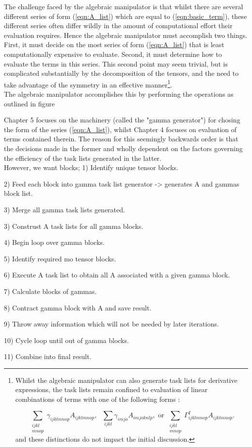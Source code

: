 \noindent The challenge faced by the algebraic manipulator is that whilst there are several different
series of form (\ref{eqn:A_list}) which are equal to (\ref{eqn:basic_term}), these different series 
often differ wildly in the amount of computational effort their evaluation requires. Hence the algebraic manipulator must
accomplish two things. First, it must decide on the most series of form (\ref{eqn:A_list}) that is least computationally expensive to
evaluate. Second, it must determine how to evaluate the terms in this series. This second point may seem trivial,
but is complicated substantially by the decomposition of the tensors, and the need to take advantage of the symmetry in 
an effective manner\footnote{Whilst
the algebraic manipulator can also generate task lists for derivative expressions, the task lists remain 
confined to evaluation of linear combinations of terms with one of the following forms : 

\begin{equation}
\sum_{\substack{ijkl \\ mnop} }\gamma_{ijklmnop} A_{ijklmnop},
\text{ \ \ \ \ \ \ \ \ }
\sum_{ijkl}\gamma_{imjo} A_{imjoknlp},
\text{ \ \ \ \ or  \ \ \ \ }
\sum_{\substack{ijkl \\ mnop}}\Gamma^{I}_{ijklmnop} A_{ijklmnop}.
\label{eqn:kinds_of_terms}
\end{equation}
\noindent and these distinctions do not impact the initial discussion.}.\\

\noindent The algebraic manipulator accomplishes this by performing the operations as outlined in figure

\noindent Chapter 5 focuses on the machinery (called the "gamma generator") for chosing the form of the series (\ref{eqn:A_list}),
whilst Chapter 4 focuses on evaluation of terms contained therein. The reason for this seemingly backwards order is that
the decisions made in the former and wholly dependent on the factors governing the 
efficiency of the task lists generated in the latter.\\

However, we want blocks; 
1) Identify unique tensor blocks.

2) Feed each block into gamma task list generator -> generates A and gammas block list.

3) Merge all gamma task lists generated.

3) Construst A task lists for all gamma blocks.

4) Begin loop over gamma blocks. 

5) Identify required mo tensor blocks. 

6) Execute A task list to obtain all A associated with a given gamma block.

7) Calculate blocks of gammas. 

8) Contract gamma block  with A and save result.

9) Throw away information which will not be needed by later iterations. 

10) Cycle loop until out of gamma blocks.

11) Combine into final result.



